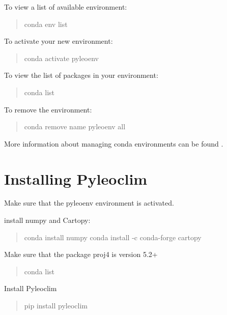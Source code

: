 \documentclass[letterpaper,10pt,english]{sphinxmanual}
\begin{document}
To view a list of available environment:
\begin{quote}

conda env list
\end{quote}

To activate your new environment:
\begin{quote}

conda activate pyleoenv
\end{quote}

To view the list of packages in your environment:
\begin{quote}

conda list
\end{quote}

To remove the environment:
\begin{quote}

conda remove \textendash{}name pyleoenv \textendash{}all
\end{quote}

More information about managing conda environments can be found .


\section{Installing Pyleoclim}
\label{\detokenize{Installation:installing-pyleoclim}}
Make sure that the pyleoenv environment is activated.

 install numpy and Cartopy:
\begin{quote}

conda install numpy
conda install -c conda-forge cartopy
\end{quote}

Make sure that the package proj4 is version 5.2+
\begin{quote}

conda list
\end{quote}

Install Pyleoclim
\begin{quote}

pip install pyleoclim
\end{quote}
\end{document}
